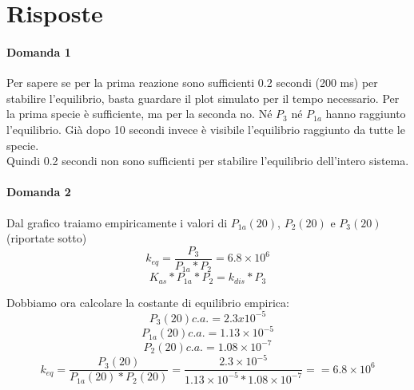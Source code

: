 \documentclass{article}
\begin{document}
\section*{Risposte}
\paragraph{Domanda 1}
Per sapere se per la prima reazione sono sufficienti 0.2 secondi (200 ms) per stabilire l'equilibrio, basta guardare il plot simulato per il tempo necessario. Per la prima specie è sufficiente, ma per la seconda no. Né $P_3$ né $P_{1a}$ hanno raggiunto l'equilibrio. Già dopo 10 secondi invece è visibile l'equilibrio raggiunto da tutte le specie.\\
Quindi 0.2 secondi non sono sufficienti per stabilire l'equilibrio dell'intero sistema.
\paragraph{Domanda 2}
Dal grafico traiamo empiricamente i valori di $P_{1a}(20)$, $P_2(20)$ e $P_3(20)$ (riportate sotto)
$$k_{eq} = \frac{ P_3}{P_{1a}*P_2} = 6.8 \times 10^6$$
$$K_{as}*P_{1a}*P_2 = k_{dis}*P_3$$

Dobbiamo ora calcolare la costante di equilibrio empirica:\\
$$P_3(20) c.a. = 2.3x10^{-5}$$
$$P_{1a}(20) c.a. = 1.13 \times 10^{-5}$$
$$P_2(20) c.a. = 1.08 \times 10^{-7}$$
$$k_{eq} = \frac{ P_3(20)}{P_{1a}(20)*P_2(20)} = \frac{2.3 \times 10^{-5}}{1.13 \times 10^{-5}*1.08 \times 10^{-7}} == 6.8 \times 10^{6}$$
\end{document}
